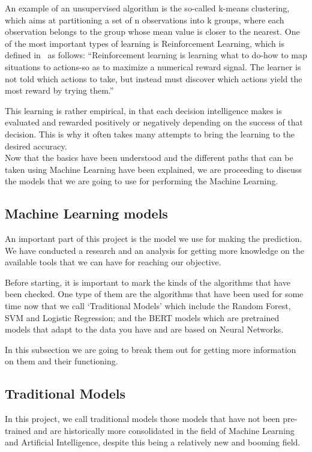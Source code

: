 An example of an unsupervised algorithm is the so-called k-means clustering, which aims at partitioning a set of n observations into k groups, where each observation belongs to the group whose mean value is closer to the nearest.
One of the most important types of learning is Reinforcement Learning, which is defined in~\cite{sutton2018reinforcement} as follows: ``Reinforcement learning is learning what to do-how to map situations to actions-so as to maximize a numerical reward signal. The learner is not told which actions to take, but instead must discover which actions yield the most reward by trying them.''

This learning is rather empirical, in that each decision intelligence makes is evaluated and rewarded positively or negatively depending on the success of that decision. This is why it often takes many attempts to bring the learning to the desired accuracy.\\

Now that the basics have been understood and the different paths that can be taken using Machine Learning have been explained, we are proceeding to discuss the models that we are going to use for performing the Machine Learning.

\subsection{Machine Learning models}
An important part of this project is the model we use for making the prediction. We have conducted a research and an analysis for getting more knowledge on the available tools that we can have for reaching our objective.

Before starting, it is important to mark the kinds of the algorithms that have been checked. One type of them are the algorithms that have been used for some time now that we call `Traditional Models' which include the Random Forest, SVM and Logistic Regression; and the  BERT models which are pretrained models that adapt to the data you have and are based on Neural Networks.

In this subsection we are going to break them out for getting more information on them and their functioning.

\subsection{Traditional Models}
In this project, we call traditional models those models that have not been pre-trained and are historically more consolidated in the field of Machine Learning and Artificial Intelligence, despite this being a relatively new and booming field.

